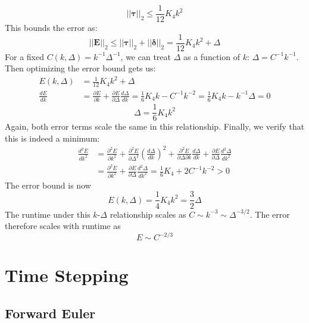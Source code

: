\documentclass[letterpaper,11pt]{article}
\newcommand*{\deriv}[2]{\frac{d #1}{d #2}}
\newcommand*{\pderiv}[2]{\frac{\partial #1}{\partial #2}}
\newcommand*{\nderiv}[3]{\frac{d^{#3} #1}{d #2^{#3}}}
\newcommand*{\npderiv}[3]{\frac{\partial^{#3} #1}{\partial #2^{#3}}}
\newcommand*{\abs}[1]{\left| #1 \right|}
\newcommand*{\norm}[1]{\abs{\abs{#1}}}
\begin{document}
\begin{flushleft}
    $$\norm{\mathbf{\tau}}_2 \leq \frac{1}{12}K_4k^2$$
    This bounds the error as:
    $$\norm{\mathbf{E}}_2 \leq \norm{\mathbf{\tau}}_2 + \norm{\mathbf{\delta}}_2 = \frac{1}{12}K_4k^2 + \Delta$$
    For a fixed $C(k, \Delta) = k^{-1}\Delta^{-1}$, we can treat $\Delta$ as a function of $k$: $\Delta = C^{-1}k^{-1}$. Then optimizing the error bound gets us:
    \begin{align*}
        E(k, \Delta) &= \frac{1}{12}K_4k^2 + \Delta \\
        \deriv{E}{k} &= \pderiv{E}{k} + \pderiv{E}{\Delta}\deriv{\Delta}{k} = \frac{1}{6}K_4k - C^{-1}k^{-2} = \frac{1}{6}K_4k - k^{-1}\Delta = 0
    \end{align*}
    $$\boxed{\Delta = \frac{1}{6}K_4k^2}$$
    Again, both error terms scale the same in this relationship. Finally, we verify that this is indeed a minimum:
    \begin{align*}
        \nderiv{E}{k}{2} &= \npderiv{E}{k}{2} + \npderiv{E}{\Delta}{2}\left(\deriv{\Delta}{k}\right)^2 + \frac{\partial^2 E}{\partial\Delta\partial k}\deriv{\Delta}{k} + \pderiv{E}{\Delta}\nderiv{\Delta}{k}{2}  \\
        &= \npderiv{E}{k}{2} + \pderiv{E}{\Delta}\nderiv{\Delta}{k}{2} = \frac{1}{6}K_4 + 2C^{-1}k^{-2} > 0
    \end{align*}
    The error bound is now
    $$\boxed{E(k, \Delta) = \frac{1}{4}K_4k^2 = \frac{3}{2}\Delta}$$
    The runtime under this $k$-$\Delta$ relationship scales as $C \sim k^{-3} \sim \Delta^{-3/2}$. The error therefore scales with runtime as
    $$\boxed{E \sim C^{-2/3}}$$

    \section{Time Stepping}
    
    \subsection{Forward Euler}

\end{flushleft}
\end{document}
